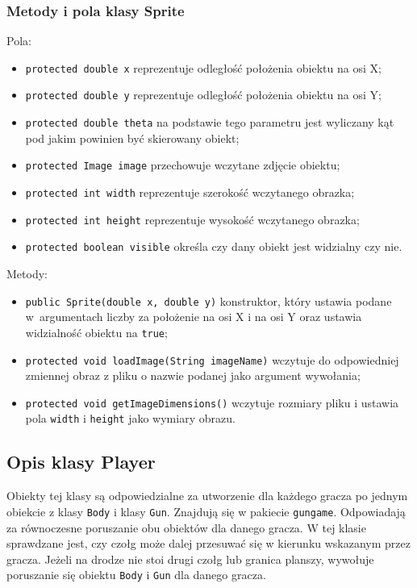 \documentclass[12pt]{report}
\newcommand{\code}[1]{\texttt{#1}}
\begin{document}
\subsubsection{Metody i pola klasy Sprite}
Pola:
\begin{itemize}
    \item \code{protected double x} reprezentuje odległość położenia obiektu na osi X;
    \item \code{protected double y} reprezentuje odległość położenia obiektu na osi Y;
    \item \code{protected double theta} na podstawie tego parametru jest wyliczany kąt pod jakim powinien być skierowany obiekt;
    \item \code{protected Image image} przechowuje wczytane zdjęcie obiektu;
    \item \code{protected int width} reprezentuje szerokość wczytanego obrazka;
    \item \code{protected int height} reprezentuje wysokość wczytanego obrazka;
    \item \code{protected boolean visible} określa czy dany obiekt jest widzialny czy nie.
\end{itemize}
Metody:
\begin{itemize}
    \item \code{public Sprite(double x, double y)} konstruktor, który ustawia podane w~argumentach liczby za położenie na osi X i na osi Y oraz ustawia widzialność obiektu na \code{true};
    \item \code{protected void loadImage(String imageName)} wczytuje do odpowiedniej zmiennej obraz z pliku o nazwie podanej jako argument wywołania;
    \item \code{protected void getImageDimensions()} wczytuje rozmiary pliku i ustawia pola \code{width} i \code{height} jako wymiary obrazu.
\end{itemize}



\subsection{Opis klasy Player}
Obiekty tej klasy są odpowiedzialne za utworzenie dla każdego gracza po jednym obiekcie z klasy \code{Body} i klasy \code{Gun}. Znajdują się w pakiecie \code{gungame}. Odpowiadają za równoczesne poruszanie obu obiektów dla danego gracza. W tej klasie sprawdzane jest, czy czołg może dalej przesuwać się w kierunku wskazanym przez gracza. Jeżeli na drodze nie stoi drugi czołg lub granica planszy, wywołuje poruszanie się obiektu \code{Body} i \code{Gun} dla danego gracza.
\end{document}
